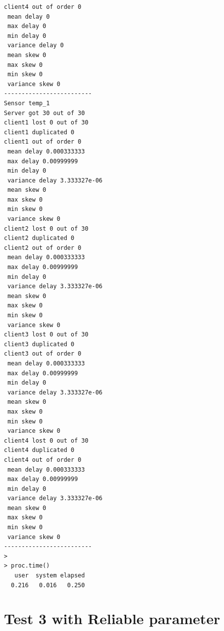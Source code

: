 \begin{verbatim}
client4 out of order 0 
 mean delay 0 
 max delay 0 
 min delay 0 
 variance delay 0 
 mean skew 0 
 max skew 0 
 min skew 0 
 variance skew 0 
-------------------------
Sensor temp_1 
Server got 30 out of 30 
client1 lost 0 out of 30 
client1 duplicated 0 
client1 out of order 0 
 mean delay 0.000333333 
 max delay 0.00999999 
 min delay 0 
 variance delay 3.333327e-06 
 mean skew 0 
 max skew 0 
 min skew 0 
 variance skew 0 
client2 lost 0 out of 30 
client2 duplicated 0 
client2 out of order 0 
 mean delay 0.000333333 
 max delay 0.00999999 
 min delay 0 
 variance delay 3.333327e-06 
 mean skew 0 
 max skew 0 
 min skew 0 
 variance skew 0 
client3 lost 0 out of 30 
client3 duplicated 0 
client3 out of order 0 
 mean delay 0.000333333 
 max delay 0.00999999 
 min delay 0 
 variance delay 3.333327e-06 
 mean skew 0 
 max skew 0 
 min skew 0 
 variance skew 0 
client4 lost 0 out of 30 
client4 duplicated 0 
client4 out of order 0 
 mean delay 0.000333333 
 max delay 0.00999999 
 min delay 0 
 variance delay 3.333327e-06 
 mean skew 0 
 max skew 0 
 min skew 0 
 variance skew 0 
-------------------------
> 
> proc.time()
   user  system elapsed 
  0.216   0.016   0.250 
\end{verbatim}


\section*{Test 3 with Reliable parameter}


